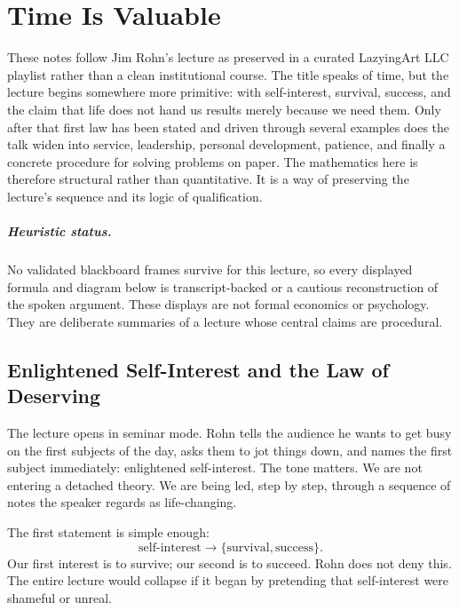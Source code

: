 \chapter{Time Is Valuable}

These notes follow Jim Rohn's lecture as preserved in a curated LazyingArt LLC playlist rather than a clean institutional course. The title speaks of time, but the lecture begins somewhere more primitive: with self-interest, survival, success, and the claim that life does not hand us results merely because we need them. Only after that first law has been stated and driven through several examples does the talk widen into service, leadership, personal development, patience, and finally a concrete procedure for solving problems on paper. The mathematics here is therefore structural rather than quantitative. It is a way of preserving the lecture's sequence and its logic of qualification.

\paragraph{Heuristic status.}
No validated blackboard frames survive for this lecture, so every displayed formula and diagram below is transcript-backed or a cautious reconstruction of the spoken argument. These displays are not formal economics or psychology. They are deliberate summaries of a lecture whose central claims are procedural.

\section{Enlightened Self-Interest and the Law of Deserving}

The lecture opens in seminar mode. Rohn tells the audience he wants to get busy on the first subjects of the day, asks them to jot things down, and names the first subject immediately: enlightened self-interest. The tone matters. We are not entering a detached theory. We are being led, step by step, through a sequence of notes the speaker regards as life-changing.

The first statement is simple enough:
\begin{equation}
\text{self-interest} \rightarrow \{\text{survival},\text{success}\}.
\end{equation}
Our first interest is to survive; our second is to succeed. Rohn does not deny this. The entire lecture would collapse if it began by pretending that self-interest were shameful or unreal.


